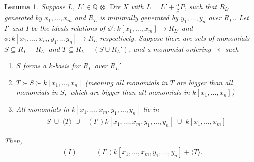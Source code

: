 \documentclass{amsart}
\theoremstyle{plain}
\newtheorem{lem}[thm]{Lemma}
\theoremstyle{definition}
\theoremstyle{remark}
\numberwithin{equation}{section}
\newcommand\BQ{{\mathbb Q}}
\DeclareMathOperator\di{Div}
\newcommand{\halfcan}{L}
\DeclareMathOperator{\initial}{in_\prec}
\begin{document}
\begin{lem}
\label{lem:relations_from_generators_induction} 
Suppose $\halfcan$, $\halfcan' \in \BQ$ $\otimes$ $\di X$ with $\halfcan=\halfcan'+\frac{\alpha}{\beta}P$, such that $R_{\halfcan'}$ generated by $x_1, \ldots, x_m$
and $R_{\halfcan}$ is minimally generated by $y_1, \ldots, y_n$ over 
$R_{\halfcan'}$.  Let $I'$ and $I$ be the ideals relations of $\phi':k[x_1, \ldots, x_m]\to R_{\halfcan'}$ and $\phi:k[x_1, \ldots, x_m, y_1, \ldots y_n]\to R_{\halfcan}$ respectively.
Suppose there are sets of monomials $S\subseteq R_\halfcan-R_{\halfcan'}$ and $T\subseteq R_\halfcan-(S\cup R_\halfcan')$, and a monomial ordering $\prec$ such 
\begin{enumerate}
\item $S$ forms a $k$-basis for $R_\halfcan$ over $R_\halfcan'$
\item $T\succ S\succ k[x_1, \ldots, x_n]$ {\rm(}meaning all monomials in $T$ are bigger than all monomials in $S,$ which are bigger than all monomials in $k[x_1, \ldots, x_n]${\rm)}
\item All monomials in $k[x_1, \ldots, x_m, y_1, \ldots, y_n]$ lie in 
\begin{align*}
	S \; \cup\; \langle T\rangle \; \cup \; \initial(I') k[x_1, \ldots, x_m, y_1, \ldots, y_n] \; \cup \; k[x_1, \ldots, x_m]
\end{align*}
\end{enumerate}
Then,
\begin{align*}
	\initial(I) & = \initial(I') k[x_1, \ldots, x_m, y_1, \ldots, y_n]
	+ \langle T \rangle.
\end{align*}
\end{lem}
\end{document}
